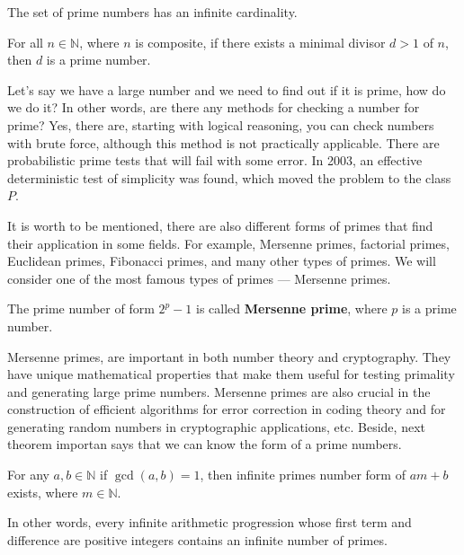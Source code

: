 \documentclass[../lecture-notes.tex]{subfiles}
\begin{document}
\begin{corollary}
    The set of prime numbers has an infinite cardinality.
\end{corollary}

\begin{lemma}
    For all $n \in \mathbb{N}$, where $n$ is composite, if there exists a 
    minimal divisor $d>1$ of $n$, then $d$ is a prime number.
\end{lemma}

Let's say we have a large number and we need to find out if it is prime, how do we do it?
In other words, are there any methods for checking a number for prime?
Yes, there are, starting with logical reasoning, you can check numbers with brute force, although
this method is not practically applicable. There are probabilistic prime tests that will fail
with some error. In 2003, an effective deterministic test of simplicity was found, which moved
the problem to the class $P$.

It is worth to be mentioned, there are also different forms of primes that find their application in some fields. 
For example, Mersenne primes, factorial primes, Euclidean primes, Fibonacci primes, and many other types of primes.
We will consider one of the most famous types of primes --- Mersenne primes.

\begin{definition} 
    The prime number of form $2^p - 1$ is called \textbf{Mersenne prime}, where $p$ is a
    prime number.
\end{definition}

Mersenne primes, are important in both number theory and cryptography.
They have unique mathematical properties that make them useful for testing primality and generating large prime numbers.
Mersenne primes are also crucial in the construction of efficient algorithms for error correction in coding theory and for generating random numbers in cryptographic applications, etc. 
Beside, next theorem importan says that we can know the form of a prime numbers.

\begin{theorem} 
    For any $a, b \in \mathbb{N}$ if $\gcd(a, b) = 1$, then infinite primes number form of $am + b$ exists, where $m \in \mathbb{N}$.
\end{theorem}

In other words, every infinite arithmetic progression whose first term and difference are positive integers contains an infinite number of primes.
\end{document}
